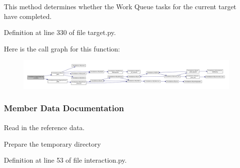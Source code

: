 \-This method determines whether the \-Work \-Queue tasks for the current target have completed. 



\-Definition at line 330 of file target.\-py.



\-Here is the call graph for this function\-:\nopagebreak
\begin{figure}[H]
\begin{center}
\leavevmode
\includegraphics[width=350pt]{classforcebalance_1_1target_1_1Target_af6099ec09486213869dba2491bd8ea04_cgraph}
\end{center}
\end{figure}




\subsubsection{\-Member \-Data \-Documentation}
\hypertarget{classforcebalance_1_1interaction_1_1Interaction_a5acc08fd127025be41f07108089c6ad0}{
\paragraph[{divisor}]{}}\label{classforcebalance_1_1interaction_1_1Interaction_a5acc08fd127025be41f07108089c6ad0}


\-Read in the reference data. 

\-Prepare the temporary directory 

\-Definition at line 53 of file interaction.\-py.

\hypertarget{classforcebalance_1_1interaction_1_1Interaction_a761d881eba96250a912eb1a4d18ae511}{
\paragraph[{e\-\_\-err}]{}}\label{classforcebalance_1_1interaction_1_1Interaction_a761d881eba96250a912eb1a4d18ae511}


